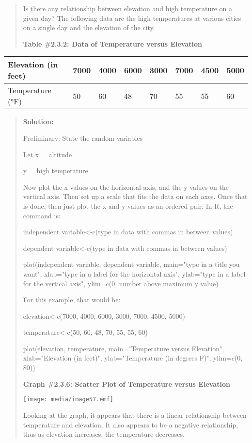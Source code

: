 \documentclass[]{book}
\begin{document}
\begin{quote}
Is there any relationship between elevation and high temperature on a
given day? The following data are the high temperatures at various
cities on a single day and the elevation of the city.

\textbf{Table \#2.3.2: Data of Temperature versus Elevation}
\end{quote}

\begin{longtable}[]{@{}llllllll@{}}
\toprule
Elevation (in feet) & 7000 & 4000 & 6000 & 3000 & 7000 & 4500 & 5000\tabularnewline
\midrule
\endhead
Temperature (°F) & 50 & 60 & 48 & 70 & 55 & 55 & 60\tabularnewline
\bottomrule
\end{longtable}

\begin{quote}
\textbf{Solution:}

Preliminary: State the random variables

Let x = altitude

y = high temperature

Now plot the x values on the horizontal axis, and the y values on the
vertical axis. Then set up a scale that fits the data on each axes.
Once that is done, then just plot the x and y values as an ordered
pair. In R, the command is:

independent variable\textless{}-c(type in data with commas in between values)

dependent variable\textless{}-c(type in data with commas in between values)

plot(independent variable, dependent variable, main="type in a title
you want", xlab="type in a label for the horizontal axis",
ylab="type in a label for the vertical axis", ylim=c(0, number above
maximum y value)

For this example, that would be:

elevation\textless{}-c(7000, 4000, 6000, 3000, 7000, 4500, 5000)

temperature\textless{}-c(50, 60, 48, 70, 55, 55, 60)

plot(elevation, temperature, main="Temperature versus Elevation",
xlab="Elevation (in feet)", ylab="Temperature (in degrees F)",
ylim=c(0, 80))

\textbf{Graph \#2.3.6: Scatter Plot of Temperature versus Elevation}

\texttt{[image: media/image57.emf]}

Looking at the graph, it appears that there is a linear relationship
between temperature and elevation. It also appears to be a negative
relationship, thus as elevation increases, the temperature decreases.
\end{quote}
\end{document}
